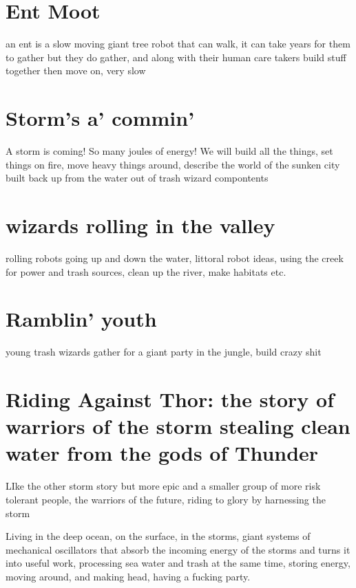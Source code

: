 \section{Ent Moot}\label{ent-moot}

an ent is a slow moving giant tree robot that can walk, it can take
years for them to gather but they do gather, and along with their human
care takers build stuff together then move on, very slow

\section{Storm's a' commin'}\label{storms-a-commin}

A storm is coming! So many joules of energy! We will build all the
things, set things on fire, move heavy things around, describe the world
of the sunken city built back up from the water out of trash wizard
compontents

\section{wizards rolling in the
valley}\label{wizards-rolling-in-the-valley}

rolling robots going up and down the water, littoral robot ideas, using
the creek for power and trash sources, clean up the river, make habitats
etc.

\section{Ramblin' youth}\label{ramblin-youth}

young trash wizards gather for a giant party in the jungle, build crazy
shit

\section{Riding Against Thor: the story of warriors of the storm
stealing clean water from the gods of
Thunder}\label{riding-against-thor-the-story-of-warriors-of-the-storm-stealing-clean-water-from-the-gods-of-thunder}

LIke the other storm story but more epic and a smaller group of more
risk tolerant people, the warriors of the future, riding to glory by
harnessing the storm

Living in the deep ocean, on the surface, in the storms, giant systems
of mechanical oscillators that absorb the incoming energy of the storms
and turns it into useful work, processing sea water and trash at the
same time, storing energy, moving around, and making head, having a
fucking party.

